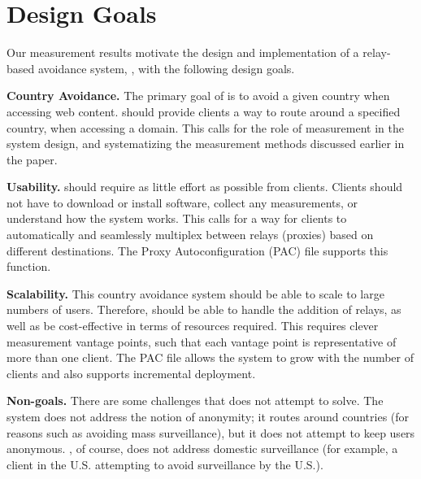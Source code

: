 \section{Design Goals}
\label{goals}

Our measurement results motivate 
 the design and implementation of a relay-based avoidance system,
\system{}, with the following design goals.

\textbf{Country Avoidance.}  The primary goal of \system{} is to
avoid a given country when accessing web content.  \system{} should
provide clients a way to route around a specified country, when
accessing a domain.  This calls for the role of measurement in the
system design, and systematizing the measurement methods discussed
earlier in the paper.

\textbf{Usability.} \system{} should require as little effort as
possible from clients.  Clients should not have to download
or install software, collect any measurements, or understand how the
system works.  This calls for a way for clients to automatically and
seamlessly multiplex between relays (proxies) based on different
destinations.  The Proxy Autoconfiguration (PAC) file supports this
function.

\textbf{Scalability.}  This country avoidance system should be able to scale to 
large numbers of users.  Therefore, \system{} should be able to handle the addition
 of relays, as well as be cost-effective in terms of resources required. This requires 
clever measurement vantage points, such that each vantage point is representative of 
more than one client.  The PAC file allows the system to 
grow with the number of clients and also supports incremental deployment.

\textbf{Non-goals.}  There are some challenges that \system{} does not attempt to 
solve.  The system does not address the notion of anonymity; it routes around 
countries (for reasons such as avoiding mass surveillance), but it does not 
attempt to keep users anonymous.  
\system{}, of course, does not address domestic surveillance (for 
example, a client in the U.S. attempting to avoid surveillance by the 
U.S.).

